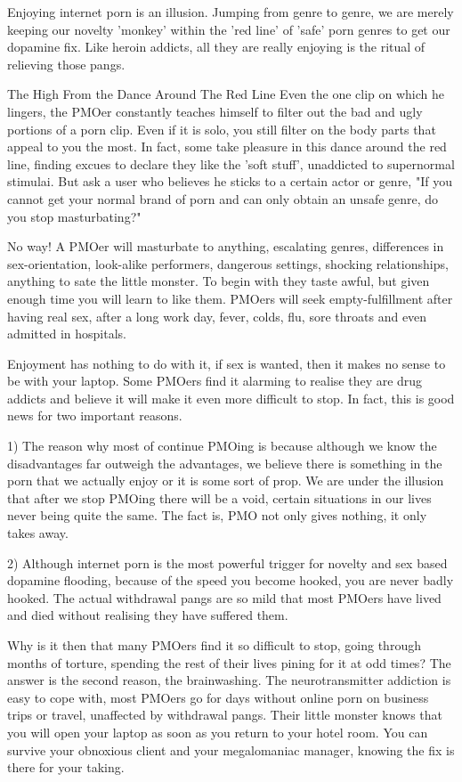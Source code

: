 Enjoying internet porn is an illusion. Jumping from genre to genre, we are merely keeping our novelty 'monkey' within the 'red line' of 'safe' porn genres to get our dopamine fix. Like heroin addicts, all they are really enjoying is the ritual of relieving those pangs.

The High From the Dance Around The Red Line
Even the one clip on which he lingers, the PMOer constantly teaches himself to filter out the bad and ugly portions of a porn clip. Even if it is solo, you still filter on the body parts that appeal to you the most. In fact, some take pleasure in this dance around the red line, finding excues to declare they like the 'soft stuff', unaddicted to supernormal stimulai. But ask a user who believes he sticks to a certain actor or genre, "If you cannot get your normal brand of porn and can only obtain an unsafe genre, do you stop masturbating?"

No way! A PMOer will masturbate to anything, escalating genres, differences in sex-orientation, look-alike performers, dangerous settings, shocking relationships, anything to sate the little monster. To begin with they taste awful, but given enough time you will learn to like them. PMOers will seek empty-fulfillment after having real sex, after a long work day, fever, colds, flu, sore throats and even admitted in hospitals.

Enjoyment has nothing to do with it, if sex is wanted, then it makes no sense to be with your laptop. Some PMOers find it alarming to realise they are drug addicts and believe it will make it even more difficult to stop. In fact, this is good news for two important reasons.

  1) The reason why most of continue PMOing is because although we know the disadvantages far outweigh the advantages, we believe there is something in the porn that we actually enjoy or it is some sort of prop. We are under the illusion that after we stop PMOing there will be a void, certain situations in our lives never being quite the same. The fact is, PMO not only gives nothing, it only takes away.

  2) Although internet porn is the most powerful trigger for novelty and sex based dopamine flooding, because of the speed you become hooked, you are never badly hooked. The actual withdrawal pangs are so mild that most PMOers have lived and died without realising they have suffered them.

Why is it then that many PMOers find it so difficult to stop, going through months of torture, spending the rest of their lives pining for it at odd times? The answer is the second reason, the brainwashing. The neurotransmitter addiction is easy to cope with, most PMOers go for days without online porn on business trips or travel, unaffected by withdrawal pangs. Their little monster knows that you will open your laptop as soon as you return to your hotel room. You can survive your obnoxious client and your megalomaniac manager, knowing the fix is there for your taking.

